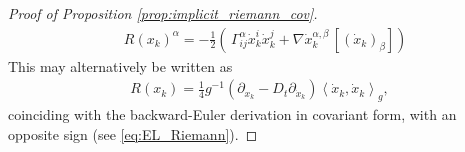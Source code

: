 \documentclass[reqno,11pt,letterpaper]{amsart}
\theoremstyle{plain}
\theoremstyle{definition}
\theoremstyle{remark}
\newtheorem{remark}{Remark}
\newcommand{\mb}{\mathbf}
\newcommand{\tr}{\mathrm{tr}}
\begin{document}
\begin{proof}[Proof of Proposition \ref{prop:implicit_riemann_cov}]
\begin{align*}
        &R(x_{k})^{\alpha} =  -\frac{1}{2} \left( \,\Gamma_{ij}^{\alpha} \dot{x}_{k}^{i} \dot{x}_{k}^{j} +  \nabla \dot{x}_{k}^{\alpha, \beta} \, [ (\dot{x}_{k})_{\beta} ]  \right) 
    \end{align*}
    This may alternatively be written as
    \begin{align}
        R(x_{k})= \frac{1}{4}g^{-1}(\partial_{x_{k}} - D_{t} \partial_{\dot{x}_{k}}) \left\langle \dot{x}_{k}, \dot{x}_{k} \right\rangle_{g},
    \end{align}
    coinciding with the backward-Euler derivation in covariant form, with an opposite sign (see \eqref{eq:EL_Riemann}).
\end{proof}

\end{document}
